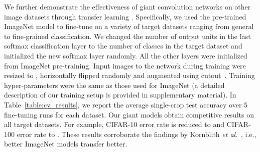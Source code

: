 \documentclass{article}
\def\onedot{.}
\def\etal{\emph{et al}\onedot}
\begin{document}
We further demonstrate the effectiveness of giant convolution networks on other image datasets through transfer learning \cite{Razavian2014,Shelhamer2017}. Specifically, we used the pre-trained ImageNet model to fine-tune on a variety of target datasets ranging from general to fine-grained classification. We changed the number of output units in the last softmax classification layer to the number of classes in the target dataset and initialized the new softmax layer randomly. All the other layers were initialized from ImageNet pre-training. Input images to the network during training were resized to , horizontally flipped randomly and augmented using cutout~\cite{devries2017improved}. Training hyper-parameters were the same as those used for ImageNet (a detailed description of our training setup is provided in supplementary material). In Table~\ref{table:cv_results}, we report the average single-crop test accuracy over 5 fine-tuning runs for each dataset. Our giant models obtain competitive results on all target datasets. For example, CIFAR-10 error rate is reduced to  and CIFAR-100 error rate to . These results corroborate the findings by Kornblith \etal~\cite{Kornblith2018}, i.e., better ImageNet models transfer better.
\end{document}

